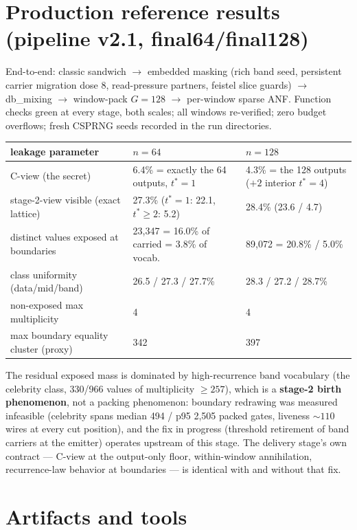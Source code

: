 \documentclass[11pt]{article}
\newcommand{\tstar}{t^{*}}
\begin{document}
\section{Production reference results (pipeline v2.1, final64/final128)}

End-to-end: classic sandwich $\to$ embedded masking (rich band seed,
persistent carrier migration dose 8, read-pressure partners, feistel slice
guards) $\to$ db\_mixing $\to$ window-pack $G{=}128$ $\to$ per-window sparse
ANF. Function checks green at every stage, both scales; all windows
re-verified; zero budget overflows; fresh CSPRNG seeds recorded in the run
directories.

\begin{table}[H]\centering
\footnotesize
\begin{tabular}{p{4.6cm}p{5.2cm}p{4.2cm}}
\toprule
leakage parameter & $n=64$ & $n=128$ \\
\midrule
C-view (the secret) & 6.4\% = exactly the 64 outputs, $\tstar{=}1$ &
  4.3\% = the 128 outputs ($+2$ interior $\tstar{=}4$) \\
stage-2-view visible (exact lattice) & 27.3\% ($\tstar{=}1$: 22.1,
  $\tstar{\geq}2$: 5.2) & 28.4\% (23.6 / 4.7) \\
distinct values exposed at boundaries & 23{,}347 = 16.0\% of carried =
  3.8\% of vocab.\ & 89{,}072 = 20.8\% / 5.0\% \\
class uniformity (data/mid/band) & 26.5 / 27.3 / 27.7\% & 28.3 / 27.2 /
  28.7\% \\
non-exposed max multiplicity & 4 & 4 \\
max boundary equality cluster (proxy) & 342 & 397 \\
\bottomrule
\end{tabular}
\end{table}

The residual exposed mass is dominated by high-recurrence band vocabulary
(the celebrity class, 330/966 values of multiplicity $\geq 257$), which is a
\textbf{stage-2 birth phenomenon}, not a packing phenomenon: boundary
redrawing was measured infeasible (celebrity spans median 494 / p95 2{,}505
packed gates, liveness ${\sim}110$ wires at every cut position), and the fix
in progress (threshold retirement of band carriers at the emitter) operates
upstream of this stage. The delivery stage's own contract --- C-view at the
output-only floor, within-window annihilation, recurrence-law behavior at
boundaries --- is identical with and without that fix.

\section{Artifacts and tools}
\end{document}
